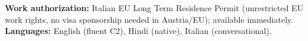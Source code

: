 \documentclass[a4paper,10pt]{article}
\begin{document}
\vspace{2pt}
{\small \textbf{Work authorization:} Italian EU Long Term Residence Permit (unrestricted EU work rights, no visa sponsorship needed in Austria/EU); available immediately. \quad \textbf{Languages:} English (fluent C2), Hindi (native), Italian (conversational).}
\end{document}
